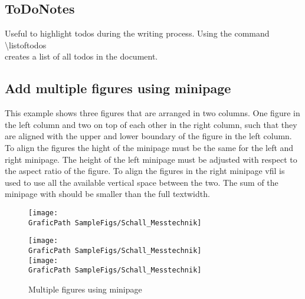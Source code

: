  \subsection{ToDoNotes}
 Useful to highlight todos during the writing process.
 Using the command \\
 \textbackslash listoftodos
 \\
 creates a list of all todos in the document.
 \\
 \subsection{Add multiple figures using minipage}
 This example shows three figures that are arranged in two columns.
 One figure in the left column and two on top of each other in the right column, such that they are aligned with the upper and lower boundary of the figure in the left column.
 To align the figures the hight of the minipage must be the same for the left and right minipage.
 The height of the left minipage must be adjusted with respect to the aspect ratio of the figure.
 To align the figures in the right minipage vfil is used to use all the available vertical space between the two.
 The sum of the minipage with should be smaller than the full textwidth.
 \begin{figure}[htb]
 	\centering
 	\begin{minipage}[c][0.525\columnwidth][c]{0.70\columnwidth} 	%
 		\texttt{[image: \\GraficPath SampleFigs/Schall\_Messtechnik]}
 	\end{minipage}
 	\hfil%
 	\begin{minipage}[c][0.525\columnwidth][c]{0.25\columnwidth}  %
 		\texttt{[image: \\GraficPath SampleFigs/Schall\_Messtechnik]}%
 		\\
 		\vfill
 		\texttt{[image: \\GraficPath SampleFigs/Schall\_Messtechnik]}
 	\end{minipage}
 	\caption[Kurztitel]{Multiple figures using minipage}
 	\label{fig:ArtificialSourceOneFoot}
 \end{figure}
